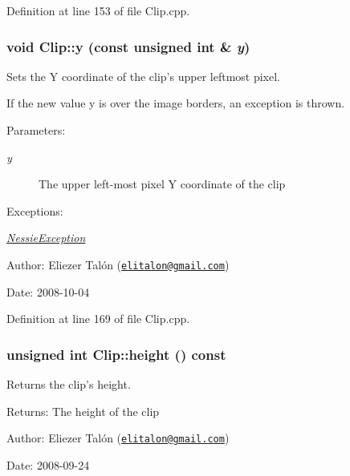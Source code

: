Definition at line 153 of file Clip.cpp.\hypertarget{class_clip_d80413e24272ee2174f76e80f4d35991}{
\subsubsection[y]{\setlength{\rightskip}{0pt plus 5cm}void Clip::y (const unsigned int \& {\em y})}}
\label{class_clip_d80413e24272ee2174f76e80f4d35991}


Sets the Y coordinate of the clip's upper leftmost pixel. 

If the new value y is over the image borders, an exception is thrown.

\begin{Desc}
\item[Parameters:]
\begin{description}
\item[{\em y}]The upper left-most pixel Y coordinate of the clip\end{description}
\end{Desc}
\begin{Desc}
\item[Exceptions:]
\begin{description}
\item[{\em \hyperlink{class_nessie_exception}{NessieException}}]\end{description}
\end{Desc}
\begin{Desc}
\item[Author:]Eliezer Talón (\href{mailto:elitalon@gmail.com}{\tt elitalon@gmail.com}) \end{Desc}
\begin{Desc}
\item[Date:]2008-10-04 \end{Desc}


Definition at line 169 of file Clip.cpp.\hypertarget{class_clip_393710a6b136f400dd5c900f8831e1a8}{
\subsubsection[height]{\setlength{\rightskip}{0pt plus 5cm}unsigned int Clip::height () const}}
\label{class_clip_393710a6b136f400dd5c900f8831e1a8}


Returns the clip's height. 

\begin{Desc}
\item[Returns:]The height of the clip\end{Desc}
\begin{Desc}
\item[Author:]Eliezer Talón (\href{mailto:elitalon@gmail.com}{\tt elitalon@gmail.com}) \end{Desc}
\begin{Desc}
\item[Date:]2008-09-24 \end{Desc}


